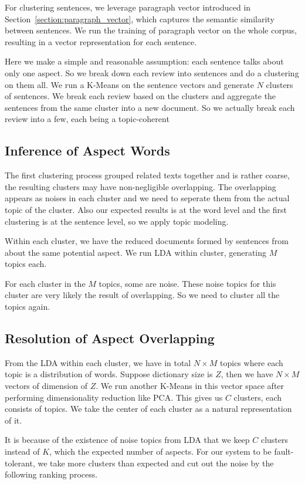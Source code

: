 For clustering sentences, we leverage paragraph vector introduced in Section~\ref{section:paragraph_vector}, which captures the semantic similarity between sentences.
We run the training of paragraph vector on the whole corpus, resulting in a vector representation for each sentence.

Here we make a simple and reasonable assumption: each sentence talks about only one aspect. So we break down each review into sentences and do a clustering on them all. We run a K-Means on the sentence vectors and generate $N$ clusters of sentences. We break each review based on the clusters and aggregate the sentences from the same cluster into a new document. So we actually break each review into a few, each being a topic-coherent 


\subsection{Inference of Aspect Words}
The first clustering process grouped related texts together and is rather coarse, the resulting clusters may have non-negligible overlapping. The overlapping appears as noises in each cluster and we need to seperate them from the actual topic of the cluster. Also our expected results is at the word level and the first clustering is at the sentence level, so we apply topic modeling. 

Within each cluster, we have the reduced documents formed by sentences from about the same potential aspect. We run LDA within cluster, generating $M$ topics each. 

For each cluster in the $M$ topics, some are noise. These noise topics for this cluster are very likely the result of overlapping. So we need to cluster all the topics again.

\subsection{Resolution of Aspect Overlapping}
From the LDA within each cluster, we have in total $N\times M$ topics where each topic is a distribution of words. Suppose dictionary size is $Z$, then we have $N\times M$ vectors of dimension of $Z$. We run another K-Means in this vector space after performing dimensionality reduction like PCA. This gives us $C$ clusters, each consists of topics. We take the center of each cluster as a natural representation of it. 

It is because of the existence of noise topics from LDA that we keep $C$ clusters instead of $K$, which the expected number of aspects. For our system to be fault-tolerant, we take more clusters than expected and cut out the noise by the following ranking process.



